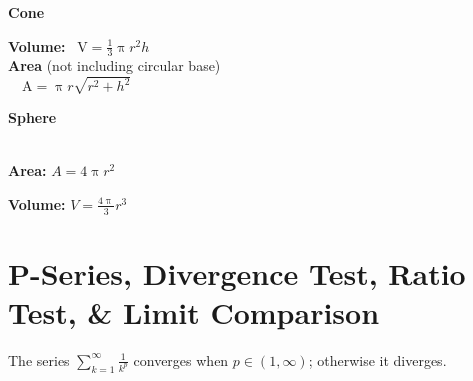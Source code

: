 \documentclass[letterpaper,landscape,9pt,fleqn]{extarticle}
\begin{document}
\begin{multicols*}{2}
\noindent \textbf{Cone} \\
  \begin{minipage}[c]{0.25\textwidth}
  \end{minipage}
  \begin{minipage}[c]{0.25\textwidth}
  \noindent \textbf{Volume:} \,
  \(
     \mbox{V} = \frac{1}{3} \uppi r^2 h
  \) \\ 
  
\noindent \textbf{Area} (not including circular base) \, \\
\(
   \quad \mbox{A} =  \uppi r   \sqrt{r^2+h^2}
\) \\
\end{minipage}

\noindent \textbf{Sphere} \\
\begin{minipage}[c]{0.25\textwidth}
\(\phantom{xxx}\)
\end{minipage}
\begin{minipage}[c]{0.25\textwidth}
\noindent  \textbf{Area:}   \(A = 4 \uppi   r^2 \)

\noindent  \textbf{Volume:}   \(V = \frac{4 \uppi}{3} r^3 \)
\end{minipage}


\section*{P-Series, Divergence Test, Ratio Test, \& Limit Comparison}

\vspace{0.25in}
\begin{minipage}[c]{0.5\textwidth}
The series \(\sum_{k=1}^\infty \frac{1}{k^p}\) converges when $p \in (1,\infty)$;
otherwise it diverges.


\end{minipage}
\end{multicols*}
\end{document}
